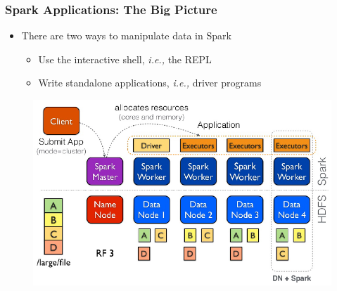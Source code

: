 \begin{frame}
\frametitle{Spark Applications: The Big Picture}
\begin{itemize}
	\item There are two ways to manipulate data in Spark
	\begin{itemize}
		\item Use the interactive shell, \textit{i.e.,} the REPL
		\item Write standalone applications, \textit{i.e.,} driver programs
	\end{itemize}
\end{itemize}

	\begin{figure}[h]
	  \centering
	  \includegraphics[scale=0.33]{./Figures/spark_app_overview}
	  \label{fig:spark_app_overview}
	\end{figure}
\end{frame}


